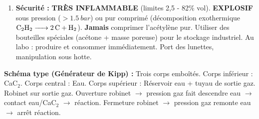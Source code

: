 \documentclass[11pt]{article}
\begin{document}
\begin{methode}
\begin{enumerate}
\begin{itemize}
        \end{itemize}
    \item \textbf{Sécurité :}  \textbf{TRÈS INFLAMMABLE} (limites 2,5 - 82\% vol). \textbf{EXPLOSIF} sous pression ($> \SI{1,5}{bar}$) ou pur comprimé (décomposition exothermique $\ce{C2H2 -> 2 C + H2}$). \textbf{Jamais} comprimer l'acétylène pur. Utiliser des bouteilles spéciales (acétone + masse poreuse) pour le stockage industriel. Au labo : produire et consommer immédiatement. Port des lunettes, manipulation sous hotte.
\end{enumerate}
\textbf{Schéma type (Générateur de Kipp) :} Trois corps emboîtés. Corps inférieur : CaC$_2$. Corps central : Eau. Corps supérieur : Réservoir eau + tuyau de sortie gaz. Robinet sur sortie gaz. Ouverture robinet $\rightarrow$ pression gaz fait descendre eau $\rightarrow$ contact eau/CaC$_2$ $\rightarrow$ réaction. Fermeture robinet $\rightarrow$ pression gaz remonte eau $\rightarrow$ arrêt réaction.
\end{methode}
\end{document}
